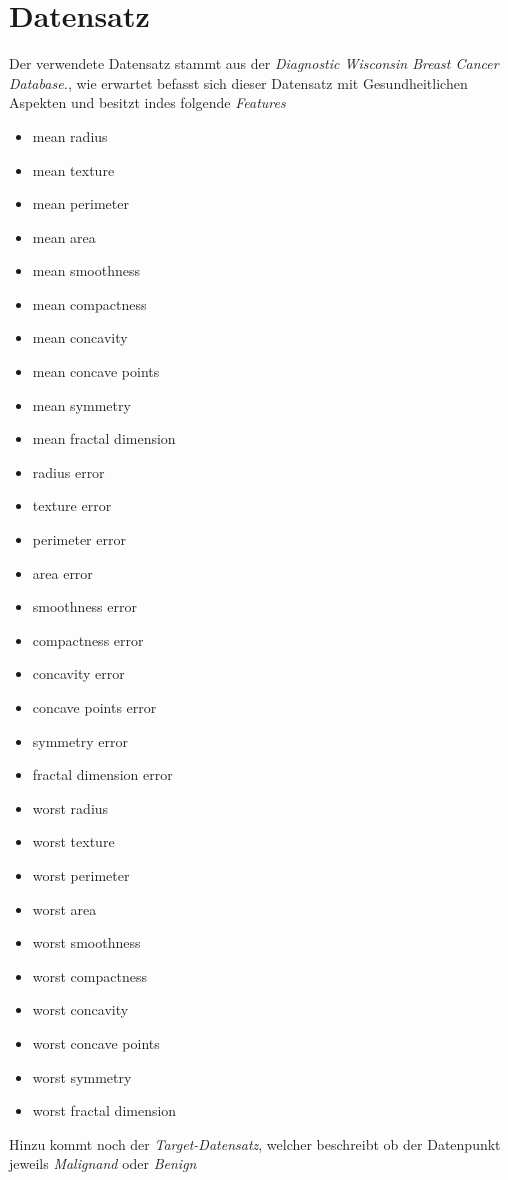 \documentclass[a4paper,12pt]{article}
\begin{document}
\section{Datensatz}
Der verwendete Datensatz stammt aus der \textit{Diagnostic Wisconsin Breast Cancer Database.}\textcite{breast_cancer_wisconsin_diagnostic_17}, wie erwartet befasst sich dieser
Datensatz mit Gesundheitlichen Aspekten und besitzt indes folgende \textit{Features}
\begin{itemize}
    \item mean radius
    \item mean texture
    \item mean perimeter
    \item mean area
    \item mean smoothness
    \item mean compactness
    \item mean concavity
    \item mean concave points
    \item mean symmetry
    \item mean fractal dimension
    \item radius error
    \item texture error
    \item perimeter error
    \item area error
    \item smoothness error
    \item compactness error
    \item concavity error
    \item concave points error
    \item symmetry error
    \item fractal dimension error
    \item worst radius
    \item worst texture
    \item worst perimeter
    \item worst area
    \item worst smoothness
    \item worst compactness
    \item worst concavity
    \item worst concave points
    \item worst symmetry
    \item worst fractal dimension
\end{itemize}
Hinzu kommt noch der \textit{Target-Datensatz}, welcher beschreibt ob der Datenpunkt jeweils \textit{Malignand} oder \textit{Benign}
\end{document}
